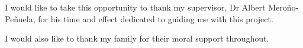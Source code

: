 I would like to take this opportunity to thank my supervisor, Dr Albert Mero{\~n}o-Pe{\~n}uela, for his time and effect dedicated to guiding me with this project. 

I would also like to thank my family for their moral support throughout. 